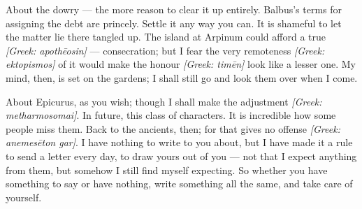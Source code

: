 

 About the dowry --- the more reason to clear it up entirely. Balbus's terms for assigning the debt are princely. Settle it any way you can. It is shameful to let the matter lie there tangled up. The island at Arpinum could afford a true \textit{[Greek: apoth\=eosin]} --- consecration; but I fear the very remoteness \textit{[Greek: ektopismos]} of it would make the honour \textit{[Greek: tim\=en]} look like a lesser one. My mind, then, is set on the gardens; I shall still go and look them over when I come.

 About Epicurus, as you wish; though I shall make the adjustment \textit{[Greek: metharmosomai]}. In future, this class of characters. It is incredible how some people miss them. Back to the ancients, then; for that gives no offense \textit{[Greek: anemes\=eton gar]}. I have nothing to write to you about, but I have made it a rule to send a letter every day, to draw yours out of you --- not that I expect anything from them, but somehow I still find myself expecting. So whether you have something to say or have nothing, write something all the same, and take care of yourself.

